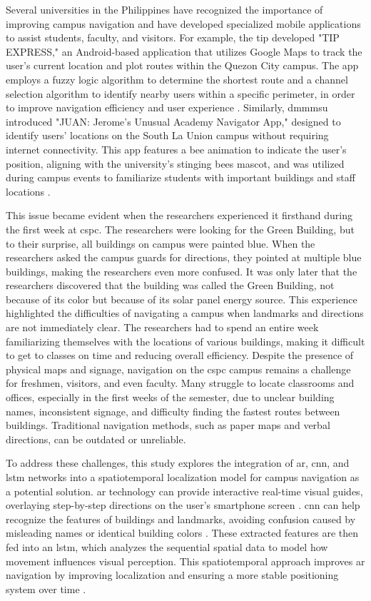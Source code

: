 \begin{refsection}
Several universities in the Philippines have recognized the importance of improving campus navigation and have developed specialized mobile applications to assist students, faculty, and visitors. For example, the \gls{tip} developed "TIP EXPRESS," an Android-based application that utilizes Google Maps to track the user's current location and plot routes within the Quezon City campus. The app employs a fuzzy logic algorithm to determine the shortest route and a channel selection algorithm to identify nearby users within a specific perimeter, in order to improve navigation efficiency and user experience \cite{5}. Similarly, \gls{dmmmsu} introduced "JUAN: Jerome's Unusual Academy Navigator App," designed to identify users' locations on the South La Union campus without requiring internet connectivity. This app features a bee animation to indicate the user's position, aligning with the university's stinging bees mascot, and was utilized during campus events to familiarize students with important buildings and staff locations \cite{6}.

This issue became evident when the researchers experienced it firsthand during the first week at \gls{cspc}. The researchers were looking for the Green Building, but to their surprise, all buildings on campus were painted blue. When the researchers asked the campus guards for directions, they pointed at multiple blue buildings, making the researchers even more confused. It was only later that the researchers discovered that the building was called the Green Building, not because of its color but because of its solar panel energy source. This experience highlighted the difficulties of navigating a campus when landmarks and directions are not immediately clear. The researchers had to spend an entire week familiarizing themselves with the locations of various buildings, making it difficult to get to classes on time and reducing overall efficiency. Despite the presence of physical maps and signage, navigation on the \gls{cspc} campus remains a challenge for freshmen, visitors, and even faculty. Many struggle to locate classrooms and offices, especially in the first weeks of the semester, due to unclear building names, inconsistent signage, and difficulty finding the fastest routes between buildings. Traditional navigation methods, such as paper maps and verbal directions, can be outdated or unreliable.

To address these challenges, this study explores the integration of \gls{ar}, \gls{cnn}, and \gls{lstm} networks into a spatiotemporal localization model for campus navigation as a potential solution. \gls{ar} technology can provide interactive real-time visual guides, overlaying step-by-step directions on the user's smartphone screen \cite{7}. \gls{cnn} can help recognize the features of buildings and landmarks, avoiding confusion caused by misleading names or identical building colors \cite{8}. These extracted features are then fed into an \gls{lstm}, which analyzes the sequential spatial data to model how movement influences visual perception. This spatiotemporal approach improves \gls{ar} navigation by improving localization and ensuring a more stable positioning system over time \cite{8}.


\end{refsection}
